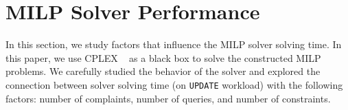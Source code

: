 % 





\section{MILP Solver Performance}
\label{app:solvtime}


In this section, we study factors that influence the MILP solver solving time. In this paper, we
use CPLEX ~\cite{cplex2014v12} as a black box to solve the constructed MILP problems. 
We carefully studied 
the behavior of the solver and explored the connection between solver solving time (on \texttt{UPDATE} workload) with the following factors:
number of complaints, number of queries, and number of constraints. 
 
